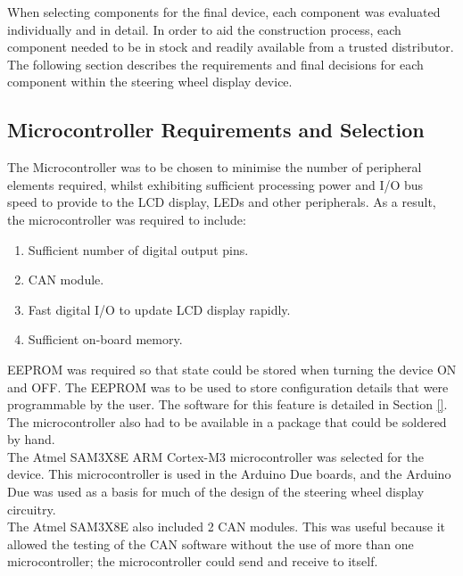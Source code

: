 \documentclass[a4paper,12pt]{article}
\begin{document}
When selecting components for the final device, each component was evaluated individually and in detail. In order to aid the construction process, each component needed to be in stock and readily available from a trusted distributor. The following section describes the requirements and final decisions for each component within the steering wheel display device. \\

\subsection{Microcontroller Requirements and Selection}
\label{sec:microcontroller}

The Microcontroller was to be chosen to minimise the number of peripheral elements required, whilst exhibiting sufficient processing power and I/O bus speed to provide to the LCD display, LEDs and other peripherals. As a result, the microcontroller was required to include:

\begin{enumerate}
  \item Sufficient number of digital output pins.
  \item CAN module.
  \item Fast digital I/O to update LCD display rapidly.
  \item Sufficient on-board memory.
\end{enumerate}

EEPROM was required so that state could be stored when turning the device ON and OFF. The EEPROM was to be used to store configuration details that were programmable by the user. The software for this feature is detailed in Section \ref{}. \\

The microcontroller also had to be available in a package that could be soldered by hand. \\

The Atmel SAM3X8E ARM Cortex-M3 microcontroller was selected for the device. This microcontroller is used in the Arduino Due boards, and the Arduino Due was used as a basis for much of the design of the steering wheel display circuitry. \\

The Atmel SAM3X8E also included 2 CAN modules. This was useful because it allowed the testing of the CAN software without the use of more than one microcontroller; the microcontroller could send and receive to itself. \\
\end{document}
